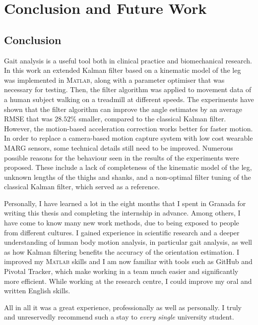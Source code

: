 \chapter{Conclusion and Future Work}\label{ch:Conclusion and Future Work}

\section{Conclusion}

Gait analysis is a useful tool both in clinical practice and biomechanical research. In this work an extended Kalman filter based on a kinematic model of the leg was implemented in \textsc{Matlab}\textsuperscript{\textregistered}, along with a parameter optimiser that was necessary for testing. Then, the filter algorithm was applied to movement data of a human subject walking on a treadmill at different speeds. The experiments have shown that the filter algorithm can improve the angle estimates by an average RMSE that was $28.52\%$ smaller, compared to the classical Kalman filter.
However, the motion-based acceleration correction works better for faster motion. In order to replace a camera-based motion capture system with low cost wearable MARG sensors, some technical details still need to be improved. Numerous possible reasons for the behaviour seen in the results of the experiments were proposed. These include a lack of completeness of the kinematic model of the leg, unknown lengths of the thighs and shanks, and a non-optimal filter tuning of the classical Kalman filter, which served as a reference.

Personally, I have learned a lot in the eight months that I spent in Granada for writing this thesis and completing the internship in advance. Among others, I have come to know many new work methods, due to being exposed to people from different cultures. I gained experience in scientific research and a deeper understanding of human body motion analysis, in particular gait analysis, as well as how Kalman filtering benefits the accuracy of the orientation estimation. I improved my \textsc{Matlab}\textsuperscript{\textregistered} skills and I am now familiar with tools such as GitHub and Pivotal Tracker, which make working in a team much easier and significantly more efficient.  While working at the research centre, I could improve my oral and written English skills.

All in all it was a great experience, professionally as well as personally. I truly and unreservedly recommend such a stay to \emph{every single} university student.

